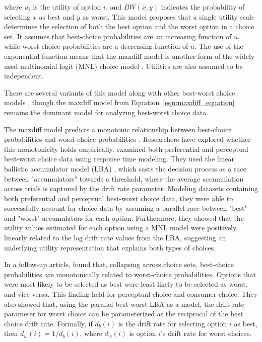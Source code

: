 where $u_{i}$ is the utility of option $i$, and $BW(x,y)$ indicates the probability of selecting $x$ as best and $y$ as worst. This model proposes that a single utility scale determines the selection of both the best option and the worst option in a choice set. It assumes that best-choice probabilities are an increasing function of $u$, while worst-choice probabilities are a decreasing function of $u$. The use of the exponential function means that the maxdiff model is another form of the widely used multinomial logit (MNL) choice model \parencite{hausman1984specification}. Utilities are also assumed to be independent.

There are several variants of this model along with other best-worst choice models \parencite{marleyProbabilisticModelsBest2005,marleyProbabilisticModelsSetdependent2008,marleyModelsBestWorst2012,flynnBestWorstScaling2007,flynn2014best}, though the maxdiff model from Equation~\ref{eqn:maxdiff_equation} remains the dominant model for analyzing best-worst choice data.

The maxdiff model predicts a monotonic relationship between best-choice probabilities and worst-choice probabilities \parencite{hawkinsBestTimesWorst2014}. Researchers have explored whether this monotonicity holds empirically. \textcite{hawkinsIntegratingCognitiveProcess2014a} examined both preferential and perceptual best-worst choice data using response time modeling. They used the linear ballistic accumulator model (LBA) \parencite{brownSimplestCompleteModel2008b}, which casts the decision process as a race between "accumulators" towards a threshold, where the average accumulation across trials is captured by the drift rate parameter. Modeling datasets containing both preferential and perceptual best-worst choice data, they were able to successfully account for choice data by assuming a parallel race between "best" and "worst" accumulators for each option. Furthermore, they showed that the utility values estimated for each option using a MNL model were positively linearly related to the log drift rate values from the LBA, suggesting an underlying utility representation that explains both types of choices. 

In a follow-up article, \textcite{hawkinsBestTimesWorst2014} found that, collapsing across choice sets, best-choice probabilities are monotonically related to worst-choice probabilities. Options that were most likely to be selected as best were least likely to be selected as worst, and vice versa. This finding held for perceptual choice and consumer choice. They also showed that, using the parallel best-worst LBA as a model, the drift rate parameter for worst choice can be parameterized as the reciprocal of the best choice drift rate. Formally, if $d_{b}(i)$ is the drift rate for selecting option $i$ as best, then $d_{w}(i)=1/d_{b}(i)$, where $d_{w}(i)$ is option $i$'s drift rate for worst choices. 

